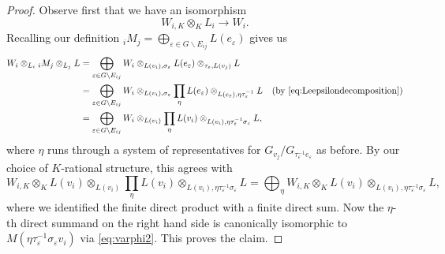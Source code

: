 \documentclass[a4paper,12pt,reqno]{amsart}
\theoremstyle{plain}
\theoremstyle{remark}
\begin{document}
  \begin{proof}
    Observe first that we have an isomorphism
    \[
    W_{i,K}\otimes_K L_i\to W_i.
    \]
    Recalling our definition ${}_iM_j=\bigoplus_{\varepsilon\in G\backslash E_{ij}}L(e_\varepsilon)$ gives us
    \begin{align*}
      W_i \otimes_{L_i} {}_iM_j\otimes_{L_j}L
      &=\bigoplus_{\varepsilon\in G\backslash E_{ij}}W_{i}\otimes_{L(v_i),\sigma_\varepsilon} L(e_\varepsilon)\otimes_{\tau_\varepsilon,L(v_j)}L\\
      &=\bigoplus_{\varepsilon\in G\backslash E_{ij}}W_{i}\otimes_{L(v_i),\sigma_\varepsilon} \prod_{\eta}L(e_\varepsilon)\otimes_{L(e_\varepsilon),\eta\tau_\varepsilon^{-1}}L&\text{(by \eqref{eq:Leepsilondecomposition})}\\
      &=\bigoplus_{\varepsilon\in G\backslash E_{ij}}W_{i}\otimes_{L(v_i)} \prod_{\eta}L(v_i)\otimes_{L(v_i),\eta\tau_\varepsilon^{-1}\sigma_\varepsilon}L,
    \end{align*}
    where $\eta$ runs through a system of representatives for $G_{v_j}/G_{\tau_\varepsilon^{-1}e_\varepsilon}$ as before. By our choice of $K$-rational structure, this agrees with
    \[
    W_{i,K}\otimes_K L(v_i)\otimes_{L(v_i)} \prod_{\eta}L(v_i)\otimes_{L(v_i),\eta\tau_\varepsilon^{-1}\sigma_\varepsilon}L=
    \bigoplus_\eta W_{i,K}\otimes_K L(v_i)\otimes_{L(v_i),\eta\tau_\varepsilon^{-1}\sigma_\varepsilon}L,
    \]
    where we identified the finite direct product with a finite direct sum. Now the $\eta$-th direct summand on the right hand side is canonically isomorphic to $M(\eta\tau_\varepsilon^{-1}\sigma_\varepsilon v_i)$ via \eqref{eq:varphi2}. This proves the claim.
  \end{proof}
\end{document}
